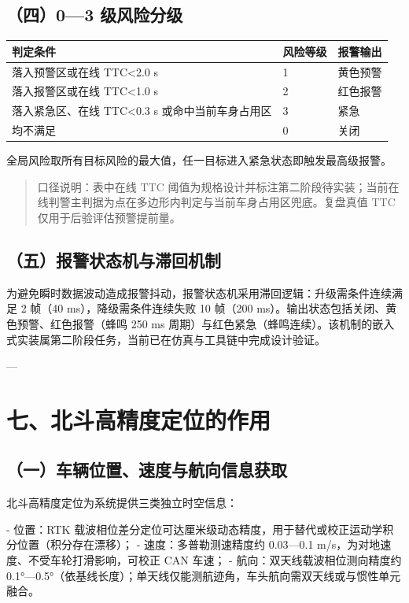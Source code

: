 \documentclass[UTF8,11pt]{ctexart}
\begin{document}
\subsection*{（四）0—3 级风险分级}
\begin{center}
\small
\begin{tabular}{p{5.6cm}p{2.2cm}p{3.2cm}}
\hline
\textbf{判定条件} & \textbf{风险等级} & \textbf{报警输出} \\
\hline
落入预警区或在线 TTC<2.0 s & 1 & 黄色预警 \\
\hline
落入报警区或在线 TTC<1.0 s & 2 & 红色报警 \\
\hline
落入紧急区、在线 TTC<0.3 s 或命中当前车身占用区 & 3 & 紧急 \\
\hline
均不满足 & 0 & 关闭 \\
\hline
\end{tabular}
\end{center}
全局风险取所有目标风险的最大值，任一目标进入紧急状态即触发最高级报警。

\begin{quote}\small
口径说明：表中在线 TTC 阈值为规格设计并标注第二阶段待实装；当前在线判警主判据为点在多边形内判定与当前车身占用区兜底。复盘真值 TTC 仅用于后验评估预警提前量。
\end{quote}
\subsection*{（五）报警状态机与滞回机制}
为避免瞬时数据波动造成报警抖动，报警状态机采用滞回逻辑：升级需条件连续满足 2 帧（40 ms），降级需条件连续失败 10 帧（200 ms）。输出状态包括关闭、黄色预警、红色报警（蜂鸣 250 ms 周期）与红色紧急（蜂鸣连续）。该机制的嵌入式实装属第二阶段任务，当前已在仿真与工具链中完成设计验证。

---

\section*{七、北斗高精度定位的作用}
\subsection*{（一）车辆位置、速度与航向信息获取}
北斗高精度定位为系统提供三类独立时空信息：

- 位置：RTK 载波相位差分定位可达厘米级动态精度，用于替代或校正运动学积分位置（积分存在漂移）； - 速度：多普勒测速精度约 0.03—0.1 m/s，为对地速度、不受车轮打滑影响，可校正 CAN 车速； - 航向：双天线载波相位测向精度约 0.1°—0.5°（依基线长度）；单天线仅能测航迹角，车头航向需双天线或与惯性单元融合。
\end{document}
